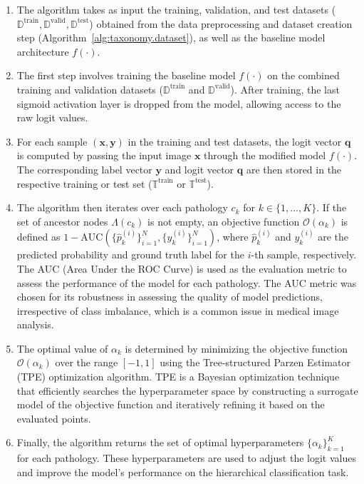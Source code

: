 \documentclass[review,1p,times,numbers]{elsarticle}
\begin{document}
\begin{enumerate}
    \item The algorithm takes as input the training, validation, and test datasets ($\mathbb{D}^{\text{train}}, \mathbb{D}^{\text{valid}}, \mathbb{D}^{\text{test}}$) obtained from the data preprocessing and dataset creation step (Algorithm~\ref{alg:taxonomy.dataset}), as well as the baseline model architecture $f(\cdot)$.
    \item The first step involves training the baseline model $f(\cdot)$ on the combined training and validation datasets ($\mathbb{D}^{\text{train}}$ and $\mathbb{D}^{\text{valid}}$). After training, the last sigmoid activation layer is dropped from the model, allowing access to the raw logit values.
    \item For each sample $(\mathbf{x}, \mathbf{y})$ in the training and test datasets, the logit vector $\mathbf{q}$ is computed by passing the input image $\mathbf{x}$ through the modified model $f(\cdot)$. The corresponding label vector $\mathbf{y}$ and logit vector $\mathbf{q}$ are then stored in the respective training or test set ($\mathbb{T}^{\text{train}}$ or $\mathbb{T}^{\text{test}}$).
    \item The algorithm then iterates over each pathology $c_k$ for $k \in \{1, \dots, K\}$. If the set of ancestor nodes $\Lambda(c_k)$ is not empty, an objective function $\mathcal{O}(\alpha_k)$ is defined as $1 - \text{AUC}(\{\hat{p}_k^{(i)}\}_{i=1}^N, \{y_k^{(i)}\}_{i=1}^N)$, where $\hat{p}_k^{(i)}$ and $y_k^{(i)}$ are the predicted probability and ground truth label for the $i$-th sample, respectively. The AUC (Area Under the ROC Curve) is used as the evaluation metric to assess the performance of the model for each pathology. The AUC metric was chosen for its robustness in assessing the quality of model predictions, irrespective of class imbalance, which is a common issue in medical image analysis.
    \item The optimal value of $\alpha_k$ is determined by minimizing the objective function $\mathcal{O}(\alpha_k)$ over the range $[-1, 1]$ using the Tree-structured Parzen Estimator (TPE) optimization algorithm. TPE is a Bayesian optimization technique that efficiently searches the hyperparameter space by constructing a surrogate model of the objective function and iteratively refining it based on the evaluated points.
    \item Finally, the algorithm returns the set of optimal hyperparameters $\{\alpha_k\}_{k=1}^K$ for each pathology. These hyperparameters are used to adjust the logit values and improve the model's performance on the hierarchical classification task.
\end{enumerate}
\end{document}
